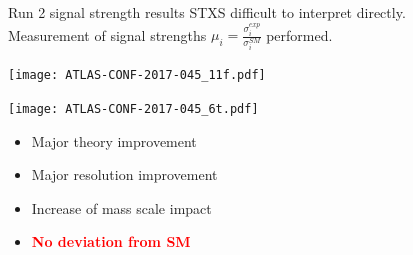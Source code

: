 \begin{frame}{Run 2 signal strength results}
  STXS difficult to interpret directly.\\
  Measurement of signal strengths $\mu_i = \frac{\sigma_i^{exp}}{\sigma_i^{SM}}$ performed.\\

  \begin{minipage}{0.49\linewidth}
    \texttt{[image: ATLAS-CONF-2017-045\_11f.pdf]}
  \end{minipage}
  \hfill
  \begin{minipage}{0.49\linewidth}
    \centering
    \texttt{[image: ATLAS-CONF-2017-045\_6t.pdf]}
  \end{minipage}

  \begin{center}
  \begin{minipage}{0.49\linewidth}
    \begin{itemize}
    \item Major theory improvement
    \item Major resolution improvement
    \item Increase of mass scale impact
    \item   \textcolor{red}{\bf No deviation from SM}
      \end{itemize}
  \end{minipage}

  \end{center}
\end{frame}
